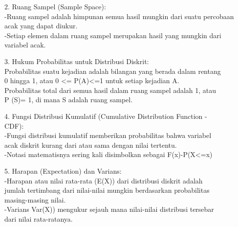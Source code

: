 \documentclass[a4paper,10pt]{article}
\begin{document}
\begin{eulernotebook}
\begin{eulercomment}
\begin{eulercomment}
\begin{eulercomment}
\begin{eulercomment}
\begin{eulercomment}
\begin{eulercomment}
\begin{eulerttcomment}
\end{eulerttcomment}
\begin{eulercomment}
2. Ruang Sampel (Sample Space):\\
-Ruang sampel adalah himpunan semua hasil mungkin dari suatu percobaan\\
acak yang dapat diukur.\\
-Setiap elemen dalam ruang sampel merupakan hasil yang mungkin dari\\
variabel acak.\\
\end{eulercomment}
\begin{eulerttcomment}
 
\end{eulerttcomment}
\begin{eulercomment}
3. Hukum Probabilitas untuk Distribusi Diskrit:\\
Probabilitas suatu kejadian adalah bilangan yang berada dalam rentang\\
0 hingga 1, atau 0 \textless{}= P(A)\textless{}=1 untuk setiap kejadian A.\\
Probabilitas total dari semua hasil dalam ruang sampel adalah 1, atau\\
P (S)= 1, di mana S adalah ruang sampel.\\
\end{eulercomment}
\begin{eulerttcomment}
 
\end{eulerttcomment}
\begin{eulercomment}
4. Fungsi Distribusi Kumulatif (Cumulative Distribution Function -\\
CDF):\\
-Fungsi distribusi kumulatif memberikan probabilitas bahwa variabel\\
acak diskrit kurang dari atau sama dengan nilai tertentu.\\
-Notasi matematisnya sering kali disimbolkan sebagai F(x)-P(X\textless{}=x)\\
\end{eulercomment}
\begin{eulerttcomment}
 
\end{eulerttcomment}
\begin{eulercomment}
5. Harapan (Expectation) dan Varians:\\
-Harapan atau nilai rata-rata (E(X)) dari distribusi diskrit adalah\\
jumlah tertimbang dari nilai-nilai mungkin berdasarkan probabilitas\\
masing-masing nilai.\\
-Varians Var(X)) mengukur sejauh mana nilai-nilai distribusi tersebar\\
dari nilai rata-ratanya.


\end{eulercomment}
\end{eulercomment}
\end{eulercomment}
\end{eulercomment}
\end{eulercomment}
\end{eulercomment}
\end{eulercomment}
\end{eulernotebook}
\end{document}
